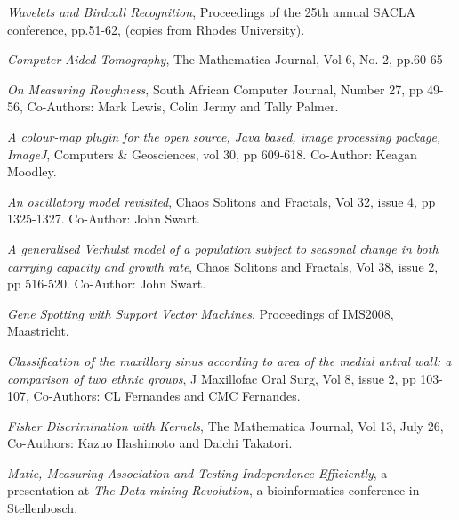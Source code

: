 \begin{description}
\begin{description}
\begin{description}
       {\it Wavelets and Birdcall Recognition},
       Proceedings of the 25th annual SACLA conference,
       pp.51-62, (copies from Rhodes University).\newline
\item[1996:]
      {\it Computer Aided Tomography},
      The Mathematica Journal, Vol 6, No. 2, pp.60-65 \newline
\item[2001:]
      {\it On Measuring Roughness}, South African Computer Journal,
      Number 27, pp 49-56, Co-Authors:
      Mark Lewis, Colin Jermy and Tally Palmer. \newline
 \item[2004:]
      {\it A colour-map plugin for the open source, Java based,
      image processing package, ImageJ},
      Computers \& Geosciences, vol 30, pp 609-618.
      Co-Author: Keagan Moodley. \newline
\item[2007:]
      {\it An oscillatory model revisited},
      Chaos Solitons and Fractals, Vol 32, issue 4, pp 1325-1327.
      Co-Author: John Swart. \newline
\item[2008:]
      {\it A generalised Verhulst model of a population
      subject to seasonal change in both carrying capacity
      and growth rate},
      Chaos Solitons and Fractals, Vol 38, issue 2, pp 516-520.
      Co-Author: John Swart. \newline
\item[2008:]
      {\it Gene Spotting with Support Vector Machines},
      Proceedings of IMS2008,
      Maastricht. \newline
\item[2009:]
      {\it Classification of the maxillary sinus
      according to area of the medial antral wall:
      a comparison of two ethnic groups},
      J Maxillofac Oral Surg, Vol 8, issue 2, pp 103-107,
      Co-Authors: CL Fernandes and CMC Fernandes. \newline
\item[2011:]
      {\it Fisher Discrimination with Kernels},
      The Mathematica Journal, Vol 13, July 26,
      Co-Authors: Kazuo Hashimoto and Daichi Takatori. \newline
\item[2012:]
       {\it Matie, Measuring Association and Testing Independence Efficiently},
       a presentation at {\it The Data-mining Revolution}, a bioinformatics conference in Stellenbosch. 

\end{description}
\end{description}
\end{description}
